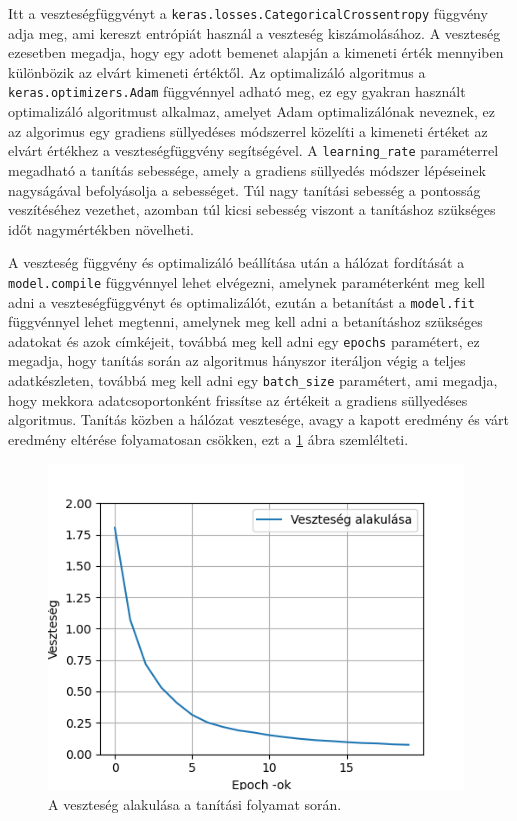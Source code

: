 \par Itt a veszteségfüggvényt a \lstinline{keras.losses.CategoricalCrossentropy} függvény adja meg\cite{chollet2015keras,tensorflow_docs}, ami kereszt entrópiát\cite{rubinstein2004cross} használ a veszteség kiszámolásához. A veszteség ezesetben megadja, hogy egy adott bemenet alapján a kimeneti érték mennyiben különbözik az elvárt kimeneti értéktől. Az optimalizáló algoritmus a \lstinline{keras.optimizers.Adam} függvénnyel\cite{chollet2015keras,tensorflow_docs} adható meg, ez egy gyakran használt optimalizáló algoritmust alkalmaz, amelyet Adam optimalizálónak neveznek, ez az algorimus egy gradiens süllyedéses módszerrel közelíti a kimeneti értéket az elvárt értékhez a veszteségfüggvény segítségével\cite{adam2014}. A \lstinline{learning_rate} paraméterrel megadható a tanítás sebessége, amely a gradiens süllyedés módszer lépéseinek nagyságával befolyásolja a sebességet. Túl nagy tanítási sebesség a pontosság veszítéséhez vezethet, azomban túl kicsi sebesség viszont a tanításhoz szükséges időt nagymértékben növelheti.
\par A veszteség függvény és optimalizáló beállítása után a hálózat fordítását a \lstinline{model.compile} függvénnyel\cite{chollet2015keras,tensorflow_docs} lehet elvégezni, amelynek paraméterként meg kell adni a veszteségfüggvényt és optimalizálót, ezután a betanítást a \lstinline{model.fit} függvénnyel\cite{chollet2015keras,tensorflow_docs} lehet megtenni, amelynek meg kell adni a betanításhoz szükséges adatokat és azok címkéjeit, továbbá meg kell adni egy \lstinline{epochs} paramétert, ez megadja, hogy tanítás során az algoritmus hányszor iteráljon végig a teljes adatkészleten, továbbá meg kell adni egy \lstinline{batch_size} paramétert, ami megadja, hogy mekkora adatcsoportonként frissítse az értékeit a gradiens süllyedéses algoritmus. Tanítás közben a hálózat vesztesége, avagy a kapott eredmény és várt eredmény eltérése folyamatosan csökken, ezt a \ref{fig:loss_metrics} ábra szemlélteti.

\begin{figure}[!ht]
    \centering
    \includegraphics[width=110mm, keepaspectratio]{figures/loss_metrics.png}
    \caption{A veszteség alakulása a tanítási folyamat során.}
    \label{fig:loss_metrics}
\end{figure}

